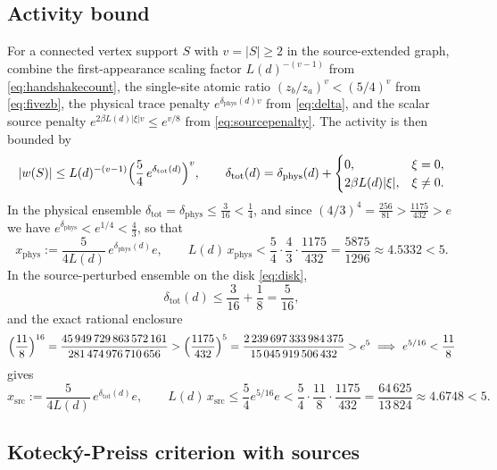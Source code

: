 \documentclass[11pt]{article}
\theoremstyle{plain}
\theoremstyle{definition}
\begin{document}
\subsection{Activity bound}

For a connected vertex support $S$ with $v=|S|\ge2$ in the source-extended graph,
combine the first-appearance scaling factor $L(d)^{-(v-1)}$ from
\eqref{eq:handshakecount}, the single-site atomic ratio $(z_b/z_a)^v<(5/4)^v$ from
\eqref{eq:fivezb}, the physical trace penalty $e^{\delta_{\mathrm{phys}}(d)v}$ from
\eqref{eq:delta}, and the scalar source penalty $e^{2\beta L(d)|\xi|v}\le e^{v/8}$ from
\eqref{eq:sourcepenalty}. The activity is then bounded by
\begin{equation}\label{eq:activity}
 |w(S)|\le L(d)^{-(v-1)}\Bigl(\frac54\,e^{\delta_{\mathrm{tot}}(d)}\Bigr)^{v},
 \qquad
 \delta_{\mathrm{tot}}(d)=\delta_{\mathrm{phys}}(d)+\begin{cases}0,& \xi=0,\\
 2\beta L(d)|\xi|,& \xi\ne0.\end{cases}
\end{equation}
In the physical ensemble $\delta_{\mathrm{tot}}=\delta_{\mathrm{phys}}\le\frac{3}{16}<\frac14$,
and since $(4/3)^4=\frac{256}{81}>\frac{1175}{432}>e$ we have
$e^{\delta_{\mathrm{phys}}}<e^{1/4}<\frac43$, so that
\begin{equation}\label{eq:xphys}
 x_{\mathrm{phys}}:=\frac{5}{4L(d)}\,e^{\delta_{\mathrm{phys}}(d)}e,
 \qquad
 L(d)\,x_{\mathrm{phys}}<\frac54\cdot\frac43\cdot\frac{1175}{432}
 =\frac{5875}{1296}\approx4.5332<5 .
\end{equation}
In the source-perturbed ensemble on the disk \eqref{eq:disk},
\begin{equation}\label{eq:deltatot}
 \delta_{\mathrm{tot}}(d)\le\frac{3}{16}+\frac18=\frac{5}{16},
\end{equation}
and the exact rational enclosure
\[
 \Bigl(\frac{11}{8}\Bigr)^{16}=\frac{45\,949\,729\,863\,572\,161}{281\,474\,976\,710\,656}
 >\Bigl(\frac{1175}{432}\Bigr)^{5}=\frac{2\,239\,697\,333\,984\,375}{15\,045\,919\,506\,432}
 >e^5
 \ \Longrightarrow\ e^{5/16}<\frac{11}{8}
\]
gives
\begin{equation}\label{eq:xsrc}
 x_{\mathrm{src}}:=\frac{5}{4L(d)}\,e^{\delta_{\mathrm{tot}}(d)}e,
 \qquad
 L(d)\,x_{\mathrm{src}}\le\frac54e^{5/16}e<\frac54\cdot\frac{11}{8}\cdot\frac{1175}{432}
 =\frac{64\,625}{13\,824}\approx4.6748<5 .
\end{equation}

\subsection{Koteck\'y-Preiss criterion with sources}
\end{document}
